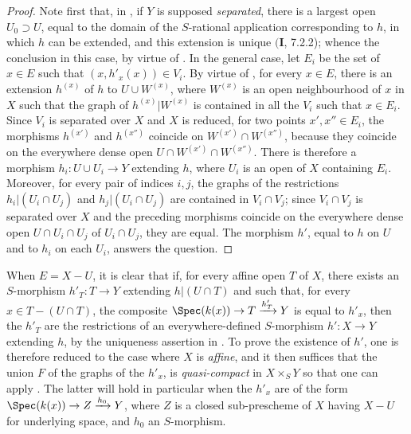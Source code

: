 \begin{proof}
Note first that, in , if $Y$ is supposed \emph{separated}, there is a largest open $U_0\supset U$, equal to the domain of the $S$-rational application corresponding to $h$, in which $h$ can be extended, and this extension is unique $(\mathbf{I}$, 7.2.2);
whence the conclusion in this case, by virtue of .
In the general case, let $E_i$ be the set of $x\in E$ such that $(x,h'_x(x))\in V_i$.
By virtue of , for every $x\in E$, there is an extension $h^{(x)}$ of $h$ to $U\cup W^{(x)}$, where $W^{(x)}$ is an open neighbourhood of $x$ in $X$ such that the graph of $h^{(x)}|W^{(x)}$ is contained in all the $V_i$ such that $x\in E_i$.
Since $V_i$ is separated over $X$ and $X$ is reduced, for two points $x',x''\in E_i$, the morphisms $h^{(x')}$ and $h^{(x'')}$ coincide on $W^{(x')}\cap W^{(x'')}$, because they coincide on the everywhere dense open $U\cap W^{(x')}\cap W^{(x'')}$.
There is therefore a morphism $h_i:U\cup U_i\to Y$ extending $h$, where $U_i$ is an open of $X$ containing $E_i$.
Moreover, for every pair of indices $i,j$, the graphs of the restrictions $h_i|(U_i\cap U_j)$ and $h_j|(U_i\cap U_j)$ are contained in $V_i\cap V_j$;
since $V_i\cap V_j$ is separated over $X$ and the preceding morphisms coincide on the everywhere dense open $U\cap U_i\cap U_j$ of $U_i\cap U_j$, they are equal.
The morphism $h'$, equal to $h$ on $U$ and to $h_i$ on each $U_i$, answers the question.
\end{proof}

\begin{remark}[20.4.8]
\label{IV.20.4.8}
When $E=X-U$, it is clear that if, for every affine open $T$ of $X$, there exists an $S$-morphism $h'_T:T\to Y$ extending $h|(U\cap T)$ and such that, for every $x\in T-(U\cap T)$, the composite $\Spec(k(x))\to T\xrightarrow{h'_T}Y$ is equal to $h'_x$, then the $h'_T$ are the restrictions of an everywhere-defined $S$-morphism $h':X\to Y$ extending $h$, by the uniqueness assertion in .
To prove the existence of $h'$, one is therefore reduced to the case where $X$ is \emph{affine}, and it then suffices that the union $F$ of the graphs of the $h'_x$, is \emph{quasi-compact} in $X\times_S Y$ so that one can apply .
The latter will hold in particular when the $h'_x$ are of the form $\Spec(k(x))\to Z\xrightarrow{h_0}Y$, where $Z$ is a closed sub-prescheme of $X$ having $X-U$ for underlying space, and $h_0$ an $S$-morphism.
\end{remark}

